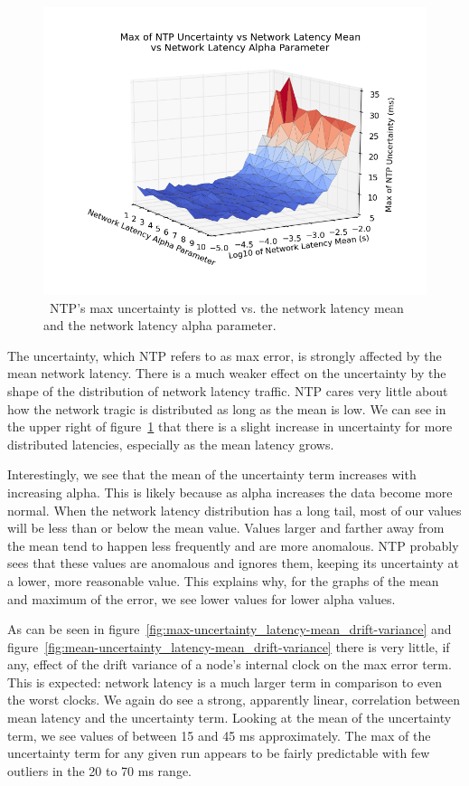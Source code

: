 \begin{figure}[h]
  \caption{~NTP's max uncertainty is plotted vs. the network latency mean and the network latency alpha parameter.}
  \label{fig:max-uncertainty_latency-mean_latency-alpha}
  \includegraphics[width=0.8\linewidth]{max_error-latency_mean-latency_alpha.png}
\end{figure}

The uncertainty, which NTP refers to as max error, 
is strongly affected by the mean network
latency. There is a much weaker effect on the uncertainty by the shape
of the distribution of network latency traffic. NTP cares very little
about how the network tragic is distributed as long as the mean is
low. We can see in the upper right of figure~\ref{fig:max-uncertainty_latency-mean_latency-alpha} that there is a slight increase in uncertainty for more
distributed latencies, especially as the mean latency grows.

Interestingly, we see that the mean of the uncertainty term increases
with increasing alpha. This is likely because as alpha increases the
data become more normal. When the network latency distribution has a
long tail, most of our values will be less than or below the mean
value. Values larger and farther away from the mean tend to happen
less frequently and are more anomalous. NTP probably sees that these
values are anomalous and ignores them, keeping its uncertainty at a
lower, more reasonable value. This explains why, for the graphs of the
mean and maximum of the error, we see lower values for lower alpha
values.

As can be seen in figure~\ref{fig:max-uncertainty_latency-mean_drift-variance} and 
figure~\ref{fig:mean-uncertainty_latency-mean_drift-variance} there is very little, if any,
effect of the drift variance of a node's internal clock on the max
error term. This is expected: network latency is a much larger term in
comparison to even the worst clocks. We again do see a strong,
apparently linear, correlation between mean latency and the uncertainty
term. Looking at the mean of the uncertainty term, we see values of
between 15 and 45 ms approximately. The max of the uncertainty term for
any given run appears to be fairly predictable with few outliers in
the 20 to 70 ms range. 

